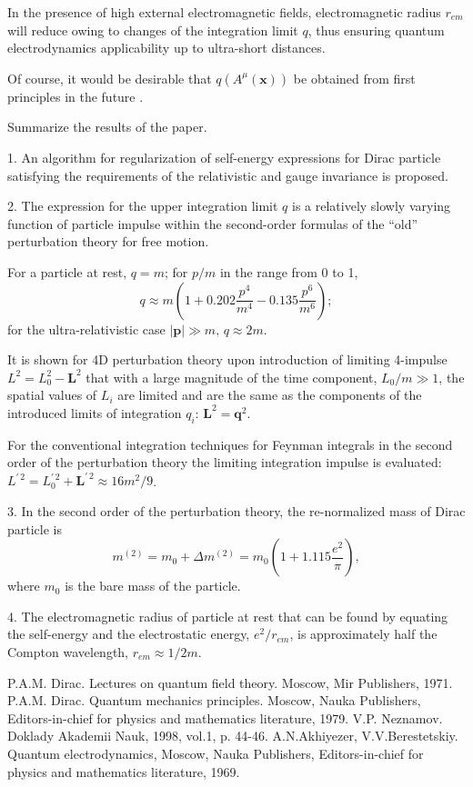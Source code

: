 \documentclass[a4paper,draft,showpacs,preprint,prd,aps]{revtex4}
\begin{document}
In the presence of high external electromagnetic fields, electromagnetic
radius $r_{em}$ will reduce owing to changes of the integration limit
$q$, thus ensuring quantum electrodynamics applicability up to
ultra-short distances.

Of course, it would be desirable that $q(A^\mu(\bm{x}))$
be obtained from first principles in the future .

Summarize the results of the paper.

1. An algorithm for regularization of self-energy expressions for Dirac
particle satisfying the requirements of the relativistic and gauge
invariance is proposed.

2. The expression for the upper integration limit $q$ is a
relatively slowly varying function of particle impulse within the
second-order formulas of the ``old'' perturbation theory for free motion.

For a particle at rest, $q=m$; for $p/m$ in the range
from 0 to 1,
\[
q \approx m\left(1 + 0.202\frac{p^4}{m^4} - 0.135\frac{p^6}{m^6}\right);
\]
for the ultra-relativistic case $|\bm{p}| \gg m,\, q \approx 2m$.

It is shown for 4D perturbation theory upon introduction of limiting
4-impulse $L^2 = L_0^2 - \bm{L}^2$ that with a large magnitude of
the time component, $L_0/m \gg 1$, the spatial values of
$L_i$ are limited and are the same as the components of the introduced
limits of integration $q_i$: $\bm{L}^2 = \bm{q}^2$.

For the conventional integration techniques for Feynman integrals in the
second order of the perturbation theory the limiting integration impulse is
evaluated:
$L^{\prime\,2} = L_0^{\prime\,2} + \bm{L}^{\prime\,2} \approx
16m^2/9$.

3. In the second order of the perturbation theory, the re-normalized mass of
Dirac particle is
\[
m^{(2)} = m_0 + \Delta m^{(2)} = m_0
\left(1 + 1.115\frac{e^2}\pi\right),
\]
where $m_0$ is the bare mass of the particle.

4. The electromagnetic radius of particle at rest that can be found by
equating the self-energy and the electrostatic energy, $e^2/r_{em}$, is
approximately half the Compton wavelength,
$r_{em} \approx 1/2m$.

\begin{thebibliography}{99}

 P.A.M. Dirac. Lectures on quantum field theory. Moscow, Mir
Publishers,
1971.
 P.A.M. Dirac. Quantum mechanics principles. Moscow, Nauka
Publishers,
Editors-in-chief for physics and mathematics literature, 1979.
 V.P. Neznamov. Doklady Akademii Nauk, 1998, vol.1, p. 44-46.
 A.N.Akhiyezer, V.V.Berestetskiy. Quantum electrodynamics,
Moscow, Nauka
Publishers, Editors-in-chief for physics and mathematics literature, 1969.

\end{thebibliography}
\end{document}
